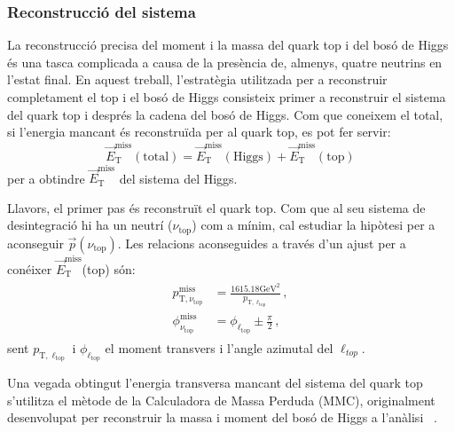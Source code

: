 \subsubsection{Reconstrucció del sistema}
\label{chap:resumen_val:tHq:Senyal:reco}
La reconstrucció precisa del moment i la massa del quark top i del bosó de Higgs és una tasca complicada
a causa de la presència de, almenys, quatre neutrins en l'estat final.
En aquest treball, l'estratègia utilitzada per a reconstruir completament el top i el bosó de Higgs consisteix primer
a reconstruir el sistema del quark top i després la cadena del bosó de Higgs. Com que coneixem
el \MET total, si l'energia mancant és reconstruïda per al quark top, es pot fer servir:
\begin{equation*}
\overrightarrow{E}_{\text{T}}^{\text{miss}} (\text{total}) = \overrightarrow{E}_{\text{T}}^{\text{miss}} (\text{Higgs}) + \overrightarrow{E}_{\text{T}}^{\text{miss}} (\text{top})
\end{equation*}
per a obtindre $\overrightarrow{E}_{\text{T}}^{\text{miss}}$ del sistema del Higgs.

Llavors, el primer pas és reconstruït el quark top.
Com que al seu sistema de desintegració hi ha un neutrí ($\nu_{\text{top}}$) com a mínim, cal estudiar la hipòtesi
per a aconseguir $\overrightarrow{p}(\nu_{\text{top}})$. Les relacions aconseguides a través d'un ajust per a conéixer
$\overrightarrow{E}_{\text{T}}^{\text{miss}}$(top) són:
\begin{align*}
\begin{split}
p^{\text{miss}}_{\text{T}, \nu_{\text{top}}} &= \frac{1615.18 \text{GeV}^{2}}{p_{\text{T}, \ell_{\text{top}}}}\, , \\
\phi^{\text{miss}}_{\nu_{\text{top}}} &= \phi_{\ell_{\text{top}}} \pm \frac{\pi}{2} \, ,
\end{split}
\end{align*}
sent $p_{\text{T}, \ell_{\text{top}}}$ i $\phi_{\ell_{\text{top}}}$ el moment transvers i l'angle azimutal del $\ell_{top}$.

Una vegada obtingut l'energia transversa mancant del sistema del quark top s'utilitza el mètode de la Calculadora de Massa Perduda (MMC),
originalment desenvolupat per reconstruir la massa i moment del bosó de Higgs a l'anàlisi \Htautau~\cite{ELAGIN2011481}.


